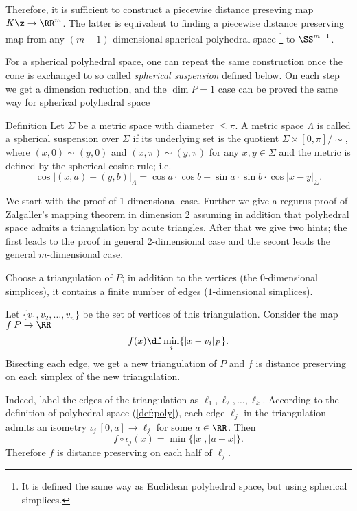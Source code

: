 Therefore, it is sufficient to construct a  piecewise distance preseving map $K\z\to\RR^m$.
The latter is equivalent to finding a piecewise distance preserving map from any $(m-1)$-dimensional spherical polyhedral space%
\footnote{It is defined the same way as Euclidean polyhedral space, but using spherical simplices.}
 to $\SS^{m-1}$.

For a spherical polyhedral space,
one can repeat the same construction once the cone is exchanged to so called 
\emph{spherical suspension} defined below.
On each step we get a dimension reduction, and the $\dim P=1$ case can be proved the same way for spherical polyhedral space

\begin{thm}{Definition}
 Let $\Sigma$ be a metric space with diameter $\le \pi$. 
A metric space $\Lambda$ is called a spherical suspension over $\Sigma$
if its underlying set 
is the quotient $\Sigma\times [0,\pi]/{\sim}$, 
where $(x,0)\sim(y,0)$ and $(x,\pi)\sim(y,\pi)$ for any $x,y\in \Sigma$
and the metric is defined by the spherical cosine rule;
i.e. 
$$\cos|(x,a)-(y,b)|_\Lambda
=\cos a\cdot \cos b
+\sin a\cdot\sin b\cdot\cos|x-y|_\Sigma.$$

\end{thm}











We start with the proof of 1-dimensional case.
Further we give a regurus proof of Zalgaller's mapping theorem in dimension 2 
assuming in addition that polyhedral space admits a triangulation by acute triangles.
After that we give two hints;
the first leads to the proof in general 2-dimensional case
and the secont leads the general $m$-dimensional case.


Choose a triangulation of $P$;
in addition to  the vertices (the $0$-dimensional simplices), 
it contains a finite number of edges ($1$-dimensional simplices).

Let $\{v_1,v_2,\dots,v_n\}$ be the set of vertices
 of this triangulation.
Consider the map $f\:P\to\RR$
$$f(x)\df\min_i\{|x-v_i|_P\}.$$
Bisecting each edge, we get a new triangulation of $P$
and $f$ is distance preserving on each simplex of 
the new triangulation.

Indeed, label the edges of the triangulation as
$\ell_1,\ell_2,\dots,\ell_k$.
According to the definition of polyhedral space (\ref{def:poly}),
each edge $\ell_j$ in the triangulation admits an isometry
$\iota_j\:[0,a]\to \ell_j$ for some $a \in \RR$.
Then 
$$f\circ\iota_j(x)=\min\{|x|,|a-x|\}.$$
Therefore $f$ is distance preserving on each half of $\ell_j$.
\qeds






